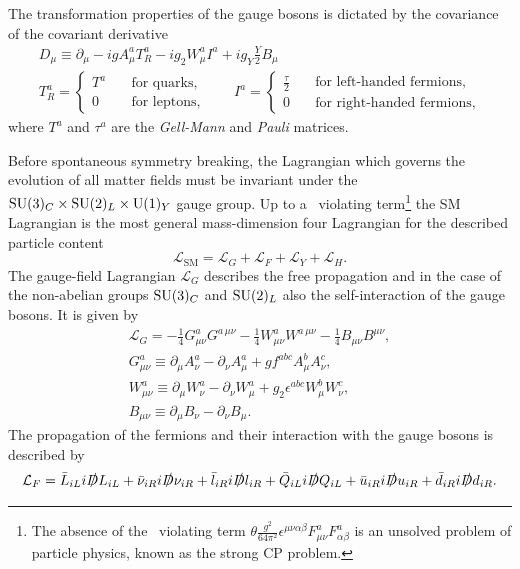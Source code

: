 The transformation properties of the gauge bosons is dictated by the covariance of the covariant derivative
\begin{equation}
\begin{gathered}
D_\mu \equiv \partial_\mu - i g A^a_\mu T_R^a - i g_2 W_\mu^a I^a + i g_Y \frac{Y}{2} B_\mu \\
T_R^a = \begin{cases} T^a \quad &\text{for quarks}, \\
  0 \quad &\text{for leptons},
\end{cases}
\qquad I^a = \begin{cases} \frac{\tau}{2} \quad &\text{for left-handed fermions}, \\
  0 \quad &\text{for right-handed fermions},
\end{cases}
\end{gathered}
\label{eq:2:covariant_derivative}
\end{equation}
where $T^a$ and $\tau^a$ are the \textit{Gell-Mann} and \textit{Pauli} matrices.

Before spontaneous symmetry breaking, the Lagrangian which governs the evolution of all matter fields must be invariant under the $\mathrm{SU}(3)_C \times \mathrm{SU}(2)_L \times \mathrm{U}(1)_Y$ gauge group. Up to a \Charge\Parity\ violating term\footnote{The absence of the \Charge\Parity\ violating term $\theta \frac{g^2}{64 \pi^2}\epsilon^{\mu \nu \alpha \beta} F^{a}_{\mu \nu} F^{a}_{\alpha \beta}$ is an unsolved problem of particle physics, known as the strong CP problem.} the SM Lagrangian is the most general mass-dimension four Lagrangian for the described particle content
\begin{equation}
\mathcal{L}_\mathrm{SM} = \mathcal{L}_G + \mathcal{L}_F + \mathcal{L}_Y + \mathcal{L}_H.
\end{equation}
The gauge-field Lagrangian $\mathcal{L}_G$ describes the free propagation and in the case of the non-abelian groups $\mathrm{SU}(3)_C$ and $\mathrm{SU}(2)_L$ also the self-interaction of the gauge bosons. It is given by
\begin{equation}
\begin{gathered}
\mathcal{L}_G = - \frac{1}{4} G^{a}_{\mu \nu} G^{a\, \mu\nu} - \frac{1}{4} W^a_{\mu \nu} W^{a\, \mu\nu} - \frac{1}{4} B_{\mu\nu} B^{\mu \nu}, \\
G^a_{\mu\nu} \equiv \partial_\mu A^a_\nu - \partial_\nu A^a_\mu + g f^{abc} A^b_\mu A^c_\nu, \\
W^a_{\mu\nu} \equiv \partial_\mu W^a_\nu - \partial_\nu W^a_\mu + g_2 \epsilon^{abc} W^b_\mu W^c_\nu, \\
B_{\mu\nu} \equiv \partial_\mu B_\nu - \partial_\nu B_\mu.
\end{gathered}
\end{equation}
The propagation of the fermions and their interaction with the gauge bosons is described by
\begin{equation}
\mathcal{L}_F = \bar{L}_{iL} i \slashed{D} L_{iL} + \bar{\nu}_{iR} i \slashed{D} \nu_{iR} + \bar{l}_{iR} i \slashed{D} l_{iR} + \bar{Q}_{iL} i \slashed{D} Q_{iL} + \bar{u}_{iR} i \slashed{D} u_{iR} + \bar{d}_{iR} i \slashed{D} d_{iR}.
\end{equation}


